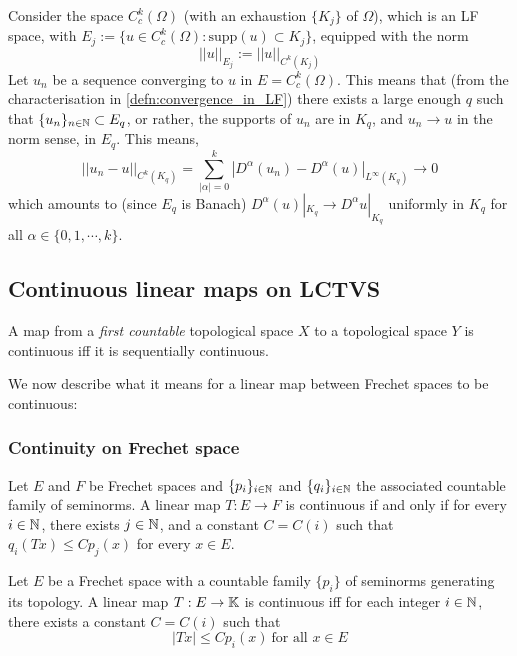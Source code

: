 \begin{example}
Consider the space $C^k_c(\Omega)$ (with an exhaustion $\{K_j\}$ of $\Omega$), which is an LF space, with $E_j:=\{u\in C^k_c(\Omega):\mathrm{supp}(u)\subset K_j\}$, equipped with the norm $$||u||_{E_j}:=||u||_{C^k(K_j)}$$
Let $u_n$ be a sequence converging to $u$ in $E=C^k_c(\Omega)$. This means that (from the characterisation in \ref{defn:convergence_in_LF}) there exists a large enough $q$ such that $\{u_n\}_{n\in \mathbb{N}} \subset E_q$, or rather, the supports of $u_n$ are in $K_q$, and $u_n\to u$ in the norm sense, in $E_q$. This means, $$||u_n-u||_{C^k(K_q)}=\sum_{|\alpha|=0}^k |D^{\alpha}(u_n)-D^{\alpha}(u)|_{L^{\infty}(K_q)}\to 0$$ which amounts to (since $E_q$ is Banach) $D^{\alpha}(u)|_{K_q}\to D^{\alpha}u|_{K_q}$ uniformly in $K_q$ for all $\alpha\in \{0,1,\cdots,k\}$.    
\end{example}

\subsection{Continuous linear maps on LCTVS}

\begin{proposition}
    A map from a \emph{first countable} topological space $X$ to a topological space $Y$ is continuous iff it is sequentially continuous.
\end{proposition}

We now describe what it means for a linear map between Frechet spaces to be continuous:
\subsubsection{Continuity on Frechet space}
\begin{proposition}
    Let $E$ and $F$ be Frechet spaces and $\{p_i\}_{i\in \mathbb{N}}$ and $\{q_i\}_{i\in \mathbb{N}}$ the associated countable family of seminorms. A linear map $T:E\to F$ is continuous if and only if for every $i\in \mathbb{N}$, there exists $j\in \mathbb{N}$, and a constant $C=C(i)$ such that $q_i(Tx)\leq Cp_j(x)$ for every $x\in E$.
\end{proposition}

\begin{proposition}
    Let $E$ be a Frechet space with a countable family $\{p_i\}$ of seminorms generating its topology. A linear map $T:E\to \mathbb{K}$ is continuous iff for each integer $i\in \mathbb{N}$, there exists a constant $C=C(i)$ such that $$|Tx|\leq Cp_i(x)\ \text{for all }x\in E$$ 
\end{proposition}

